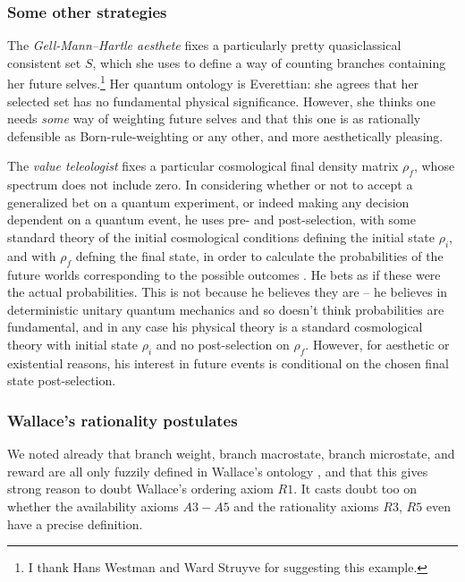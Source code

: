 \documentclass[aps,
pra,epsfig,12pt]{revtex4}
\begin{document}
\subsubsection{Some other strategies}

The {\it Gell-Mann--Hartle aesthete} fixes a particularly pretty 
quasiclassical consistent set $S$, which she uses to define a way 
of counting branches containing
her future selves.\footnote{I thank Hans Westman and Ward Struyve for
suggesting this example.}  Her quantum ontology is Everettian: she
agrees that her selected set has no fundamental physical significance.  
However, she thinks one needs {\it some} way of 
weighting future selves and that this one is as rationally
defensible as Born-rule-weighting or any other, and more aesthetically 
pleasing. 

The {\it value teleologist} fixes
a particular cosmological final density matrix $\rho_f$, whose
spectrum does not include zero.
In considering whether or not to accept a generalized bet on
a quantum experiment, or indeed making any decision dependent on a
quantum event, he uses pre- and post-selection, with some standard
theory of the initial cosmological conditions defining the initial
state $\rho_i$, and with $\rho_f$ defning the final state, in order to 
calculate the probabilities of the future worlds corresponding to the
possible outcomes \cite{aharonovetal, gmhtwotime}  .
He bets as if these were the actual probabilities.  This is not because 
he believes they are -- he believes in deterministic
unitary quantum mechanics and so doesn't think probabilities are
fundamental, and in any case
his physical theory is a standard cosmological theory with 
initial state $\rho_i$ and no post-selection on $\rho_f$.
However, for aesthetic or existential reasons, his interest in 
future events is conditional on the chosen final state post-selection.  

\subsubsection{Wallace's rationality postulates} 

We noted already that branch weight, branch macrostate, branch 
microstate, and reward are all only fuzzily defined in 
Wallace's ontology \cite{wallacevolone}, and that 
this gives strong reason to doubt Wallace's ordering axiom $R1$.   
It casts doubt too on whether the availability axioms $A3-A5$ and the 
rationality axioms $R3$, $R5$ even have a precise definition. 
\end{document}
